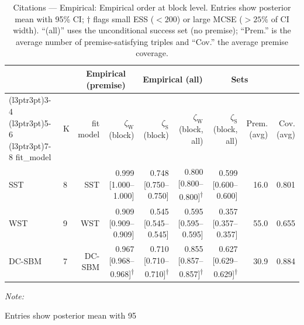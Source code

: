 \begin{table}
\centering
\caption{\label{tab:tab:citations-empirical-emp-block}Citations — Empirical: Empirical order at block level. Entries show posterior mean with 95\% CI; $\dagger$ flags small ESS ($<200$) or large MCSE ($>25\%$ of CI width). “(all)” uses the unconditional success set (no premise); “Prem.” is the average number of premise-satisfying triples and “Cov.” the average premise coverage.}
\centering
\begin{threeparttable}
\begin{tabular}[t]{llrrrrrrr}
\toprule
\multicolumn{2}{c}{ } & \multicolumn{2}{c}{Empirical (premise)} & \multicolumn{2}{c}{Empirical (all)} & \multicolumn{2}{c}{Sets} \\
\cmidrule(l{3pt}r{3pt}){3-4} \cmidrule(l{3pt}r{3pt}){5-6} \cmidrule(l{3pt}r{3pt}){7-8}
fit_model & K & fit model & $\zeta_{\mathrm{W}}$ (block) & $\zeta_{\mathrm{S}}$ (block) & $\zeta_{\mathrm{W}}$ (block, all) & $\zeta_{\mathrm{S}}$ (block, all) & Prem. (avg) & Cov. (avg)\\
\midrule
SST & 8 & SST & 0.999 [1.000--1.000] & 0.748 [0.750--0.750] & 0.800 [0.800--0.800]\textsuperscript{$\dagger$} & 0.599 [0.600--0.600] & 16.0 & 0.801\\
WST & 9 & WST & 0.909 [0.909--0.909] & 0.545 [0.545--0.545] & 0.595 [0.595--0.595] & 0.357 [0.357--0.357] & 55.0 & 0.655\\
DC-SBM & 7 & DC-SBM & 0.967 [0.968--0.968]\textsuperscript{$\dagger$} & 0.710 [0.710--0.710]\textsuperscript{$\dagger$} & 0.855 [0.857--0.857]\textsuperscript{$\dagger$} & 0.627 [0.629--0.629]\textsuperscript{$\dagger$} & 30.9 & 0.884\\
\bottomrule
\end{tabular}
\begin{tablenotes}
\item \textit{Note: } 
\item Entries show posterior mean with 95%
\end{tablenotes}
\end{threeparttable}
\end{table}